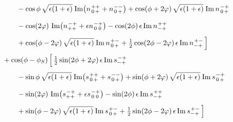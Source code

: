 \documentclass[12pt]{article}
\newcommand{\ms}{\mskip 1.5mu}
\newcommand{\im}{\operatorname{Im}}
\newcommand{\rs}[4]{s^{\ms #1 #2}_{#3 #4}}
\newcommand{\rn}[4]{n^{\ms #1 #2}_{#3 #4}}
\newcommand{\0}{{\mskip 2.5mu} 0 {\mskip 2.5mu}}
\begin{document}
\begin{align}
& \qquad{}
  - \cos\phi\, \sqrt{\epsilon (1+\epsilon)}\ms
    \im\bigl( \rn{+}{+}{\0}{+} + \rn{-}{-}{\0}{+} \bigr)
  + \cos(\phi + 2\varphi)\, \sqrt{\epsilon (1+\epsilon)}\ms
    \im\rn{-}{+}{\0}{+}
  \phantom{\frac{1}{2}}
\nonumber \\
& \qquad{}
  - \cos(2\varphi)\,
    \im\bigl( \rn{-}{+}{+}{+} + \epsilon \rn{-}{+}{\0}{\0} \bigr)
  - \cos(2\phi)\, \epsilon \im\rn{+}{+}{-}{+}
  \phantom{\frac{1}{2}}
\nonumber \\
& \qquad{}
  + \cos(\phi - 2\varphi)\, \sqrt{\epsilon (1+\epsilon)}\ms
    \im\rn{+}{-}{\0}{+}
  + \tfrac{1}{2} \cos(2\phi - 2\varphi)\, \epsilon \im\rn{+}{-}{-}{+}
\,\Bigr]
  \phantom{\frac{1}{2}}
\nonumber \\
& {}
+ \cos(\phi-\phi_S)\, \Bigl[\,
  \tfrac{1}{2} \sin(2\phi + 2\varphi)\, \epsilon \im\rs{-}{+}{-}{+}
  \phantom{\frac{1}{2}}
\nonumber \\
& \qquad{}
  - \sin\phi\,  \sqrt{\epsilon (1+\epsilon)}\ms
    \im\bigl( \rs{+}{+}{\0}{+} + \rs{-}{-}{\0}{+} \bigr)
  + \sin(\phi + 2\varphi)\, \sqrt{\epsilon (1+\epsilon)}\ms
    \im\rs{-}{+}{\0}{+}
  \phantom{\frac{1}{2}}
\nonumber \\
& \qquad{}
  - \sin(2\varphi)\,
    \im\bigl( \rs{-}{+}{+}{+} + \epsilon \rs{-}{+}{\0}{\0} \bigr)
  - \sin(2\phi)\, \epsilon \im\rs{+}{+}{-}{+}
  \phantom{\frac{1}{2}}
\nonumber \\
& \qquad{}
  + \sin(\phi - 2\varphi)\, \sqrt{\epsilon (1+\epsilon)}\ms
    \im\rs{+}{-}{\0}{+}
  + \tfrac{1}{2} \sin(2\phi - 2\varphi)\, \epsilon \im\rs{+}{-}{-}{+}
\,\Bigr]
  \phantom{\frac{1}{2}}
\end{align}
%
\end{document}

